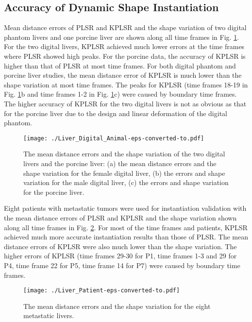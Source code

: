 \documentclass[review]{elsarticle}
\begin{document}
\subsection{Accuracy of Dynamic Shape Instantiation}
\label{sub:Dynamic Shape Instantiation}
Mean distance errors of PLSR and KPLSR and the shape variation of two digital phantom livers and one porcine liver are shown along all time frames in Fig. \ref{fig:Liver_Digital_Animal}. For the two digital livers, KPLSR achieved much lower errors at the time frames where PLSR showed high peaks. For the porcine data, the accuracy of KPLSR is higher than that of PLSR at most time frames. For both digital phantom and porcine liver studies, the mean distance error of KPLSR is much lower than the shape variation at most time frames. The peaks for KPLSR (time frames 18-19 in Fig. \ref{fig:Liver_Digital_Animal}b and time frames 1-2 in Fig. \ref{fig:Liver_Digital_Animal}c) were caused by boundary time frames. The higher accuracy of KPLSR for the two digital livers is not as obvious as that for the porcine liver due to the design and linear deformation of the digital phantom. 

\begin{figure}[thpb]
\centering
\texttt{[image: ./Liver\_Digital\_Animal-eps-converted-to.pdf]}
\caption{The mean distance errors and the shape variation of the two digital livers and the porcine liver: (a) the mean distance errors and the shape variation for the female digital liver, (b) the errors and shape variation for the male digital liver, (c) the errors and shape variation for the porcine liver.}
\label{fig:Liver_Digital_Animal}
\end{figure}

Eight patients with metastatic tumors were used for instantiation validation with the mean distance errors of PLSR and KPLSR and the shape variation shown along all time frames in Fig. \ref{fig:Liver_Patient}. For most of the time frames and patients, KPLSR achieved much more accurate instantiation results than those of PLSR. The mean distance errors of KPLSR were also much lower than the shape variation. The higher errors of KPLSR (time frames 29-30 for P1, time frames 1-3 and 29 for P4, time frame 22 for P5, time frame 14 for P7) were caused by boundary time frames.

\begin{figure}[thpb]
\centering
\texttt{[image: ./Liver\_Patient-eps-converted-to.pdf]}
\caption{The mean distance errors and the shape variation for the eight metastatic livers.}
\label{fig:Liver_Patient}
\end{figure}
\end{document}
